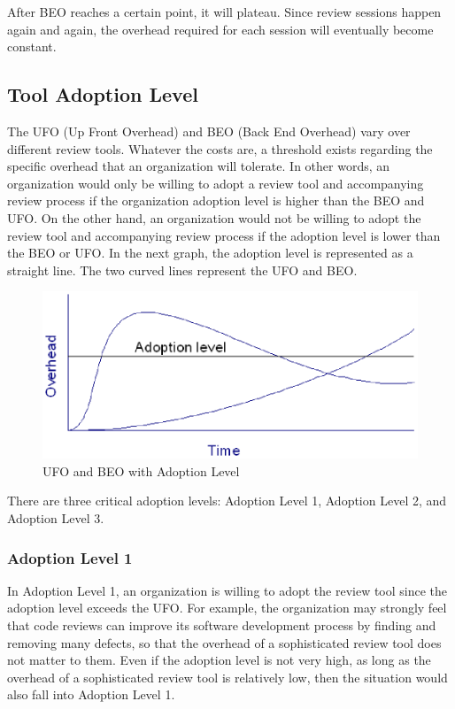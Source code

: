 After BEO reaches a certain point, it will plateau. Since review sessions happen again and again, the overhead required for each session will eventually become constant.

\subsection{Tool Adoption Level}
\label{subsec:tool-adoption-level}

The UFO (Up Front Overhead) and BEO (Back End Overhead) vary over different review tools. Whatever the costs are, a threshold exists regarding the specific overhead that an organization will tolerate. In other words, an organization would only be willing to adopt a review tool and accompanying review process if the organization adoption level is higher than the BEO and UFO. On the other hand, an organization would not be willing to adopt the review tool and accompanying review process if the adoption level is lower than the BEO or UFO. In the next graph, the adoption level is represented as a straight line.  The two curved lines represent the UFO and BEO.

\begin{figure}[htbp]
  \centering
  \includegraphics{images/fig1-3.eps}
  \caption{UFO and BEO with Adoption Level}
  \label{fig1-3}
\end{figure}

There are three critical adoption levels: Adoption Level 1, Adoption Level 2, and Adoption Level 3.

\subsubsection{Adoption Level 1}
\label{subsec:adoption-level-1}

In Adoption Level 1, an organization is willing to adopt the review tool since the adoption level exceeds the UFO. For example, the organization may strongly feel that code reviews can improve its software development process by finding and removing many defects, so that the overhead of a sophisticated review tool does not matter to them. Even if the adoption level is not very high, as long as the overhead of a sophisticated review tool is relatively low, then the situation would also fall into Adoption Level 1.

